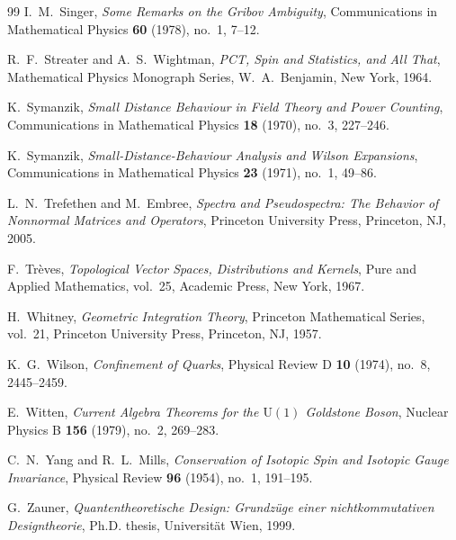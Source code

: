 \begin{thebibliography}{99}
I.~M.~Singer,
\textit{Some Remarks on the Gribov Ambiguity},
Communications in Mathematical Physics \textbf{60} (1978), no.~1, 7--12.

R.~F.~Streater and A.~S.~Wightman,
\textit{PCT, Spin and Statistics, and All That},
Mathematical Physics Monograph Series, W.~A.~Benjamin, New York, 1964.

K.~Symanzik,
\textit{Small Distance Behaviour in Field Theory and Power Counting},
Communications in Mathematical Physics \textbf{18} (1970), no.~3, 227--246.

K.~Symanzik,
\textit{Small-Distance-Behaviour Analysis and Wilson Expansions},
Communications in Mathematical Physics \textbf{23} (1971), no.~1, 49--86.

L.~N.~Trefethen and M.~Embree,
\textit{Spectra and Pseudospectra: The Behavior of Nonnormal Matrices and Operators},
Princeton University Press, Princeton, NJ, 2005.

F.~Tr{\`e}ves,
\textit{Topological Vector Spaces, Distributions and Kernels},
Pure and Applied Mathematics, vol.~25, Academic Press, New York, 1967.

H.~Whitney,
\textit{Geometric Integration Theory},
Princeton Mathematical Series, vol.~21, Princeton University Press, Princeton, NJ, 1957.

K.~G.~Wilson,
\textit{Confinement of Quarks},
Physical Review D \textbf{10} (1974), no.~8, 2445--2459.

E.~Witten,
\textit{Current Algebra Theorems for the $\mathrm{U}(1)$ Goldstone Boson},
Nuclear Physics B \textbf{156} (1979), no.~2, 269--283.

C.~N.~Yang and R.~L.~Mills,
\textit{Conservation of Isotopic Spin and Isotopic Gauge Invariance},
Physical Review \textbf{96} (1954), no.~1, 191--195.

G.~Zauner,
\textit{Quantentheoretische Design: Grundz{\"u}ge einer nichtkommutativen Designtheorie},
Ph.D. thesis, Universit{\"a}t Wien, 1999.

\end{thebibliography}
